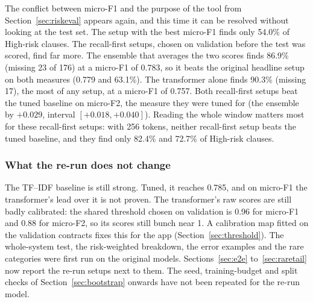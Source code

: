 The conflict between micro-F1 and the purpose of the tool from Section~\ref{sec:riskeval} appears again, and this time it can be resolved without looking at the test set. The setup with the best micro-F1 finds only 54.0\% of High-risk clauses. The recall-first setups, chosen on validation before the test was scored, find far more. The ensemble that averages the two scores finds 86.9\% (missing 23 of 176) at a micro-F1 of 0.783, so it beats the original headline setup on both measures (0.779 and 63.1\%). The transformer alone finds 90.3\% (missing 17), the most of any setup, at a micro-F1 of 0.757. Both recall-first setups beat the tuned baseline on micro-F2, the measure they were tuned for (the ensemble by $+0.029$, interval $[+0.018, +0.040]$). Reading the whole window matters most for these recall-first setups: with 256 tokens, neither recall-first setup beats the tuned baseline, and they find only 82.4\% and 72.7\% of High-risk clauses.

\subsubsection{What the re-run does not change}
The TF--IDF baseline is still strong. Tuned, it reaches 0.785, and on micro-F1 the transformer's lead over it is not proven. The transformer's raw scores are still badly calibrated: the shared threshold chosen on validation is 0.96 for micro-F1 and 0.88 for micro-F2, so its scores still bunch near 1. A calibration map fitted on the validation contracts fixes this for the app (Section~\ref{sec:threshold}). The whole-system test, the risk-weighted breakdown, the error examples and the rare categories were first run on the original models. Sections~\ref{sec:e2e} to~\ref{sec:raretail} now report the re-run setups next to them. The seed, training-budget and split checks of Section~\ref{sec:bootstrap} onwards have not been repeated for the re-run model.

